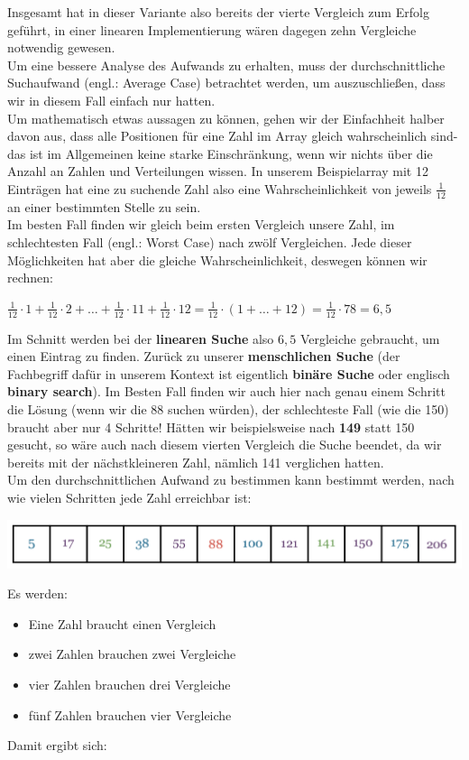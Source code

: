 \documentclass{article}
\begin{document}
Insgesamt hat in dieser Variante also bereits der vierte Vergleich zum Erfolg geführt, in einer linearen Implementierung wären dagegen zehn Vergleiche notwendig gewesen.\\
Um eine bessere Analyse des Aufwands zu erhalten, muss der durchschnittliche Suchaufwand (engl.: Average Case) betrachtet werden, um auszuschließen, dass wir in diesem Fall einfach nur  hatten. \\
Um mathematisch etwas aussagen zu können, gehen wir der Einfachheit halber davon aus, dass alle Positionen für eine Zahl im Array gleich wahrscheinlich sind- das ist im Allgemeinen keine starke Einschränkung, wenn wir nichts über die Anzahl an Zahlen und Verteilungen wissen. In unserem Beispielarray mit 12 Einträgen hat eine zu suchende Zahl also eine Wahrscheinlichkeit von jeweils $\frac{1}{12}$ an einer bestimmten Stelle zu sein. \\
Im besten Fall finden wir gleich beim ersten Vergleich unsere Zahl, im schlechtesten Fall (engl.: Worst Case) nach zwölf Vergleichen. Jede dieser Möglichkeiten hat aber die gleiche Wahrscheinlichkeit, deswegen können wir rechnen:
\begin{center}
    $\frac{1}{12}\cdot 1 + \frac{1}{12} \cdot 2 + \dots + \frac{1}{12} \cdot 11 + \frac{1}{12} \cdot 12 = \frac{1}{12} \cdot (1+\dots + 12) = \frac{1}{12}\cdot 78 = 6,5$
\end{center}
Im Schnitt werden bei der \textbf{linearen Suche }also $6,5$ Vergleiche gebraucht, um einen Eintrag zu finden.
\vspace{2mm}
Zurück zu unserer \textbf{menschlichen Suche} (der Fachbegriff dafür in unserem Kontext ist eigentlich \textbf{binäre Suche} oder englisch \textbf{binary search}). Im Besten Fall finden wir auch hier nach genau einem Schritt die Lösung (wenn wir die 88 suchen würden), der schlechteste Fall (wie die 150) braucht aber nur 4 Schritte! Hätten wir beispielsweise nach \textbf{149} statt 150 gesucht, so wäre auch nach diesem vierten Vergleich die Suche beendet, da wir bereits mit der nächstkleineren Zahl, nämlich 141 verglichen hatten. \\
Um den durchschnittlichen Aufwand zu bestimmen kann bestimmt werden, nach wie vielen Schritten jede Zahl erreichbar ist:
\begin{center}
    \includegraphics[scale=0.25]{../media/search7.png}
\end{center}
Es werden:
\begin{itemize}
    \item Eine Zahl braucht \color{re}einen Vergleich\color{black}
    \item zwei Zahlen brauchen \color{gre}zwei Vergleiche\color{black}
    \item vier Zahlen brauchen \color{blu}drei Vergleiche\color{black}
    \item fünf Zahlen brauchen \color{purp}vier Vergleiche\color{black}
\end{itemize}
Damit ergibt sich:
\end{document}
